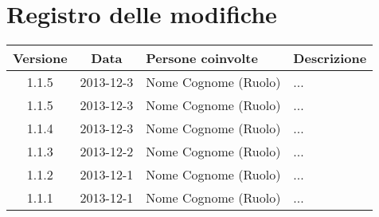 \section*{Registro delle modifiche}

\small{
\begin{tabularx}{\textwidth}{|c|c|l|X|}
 \hline \textbf{Versione} & \textbf{Data} & \textbf{Persone coinvolte} & \textbf{Descrizione} \\

 
 \hline 1.1.5 & 2013-12-3 & Nome Cognome (Ruolo) &
 ...\\

 \hline 1.1.5 & 2013-12-3 & Nome Cognome (Ruolo) &
 ...\\

 \hline 1.1.4 & 2013-12-3 & Nome Cognome (Ruolo) &
 ...\\

 \hline 1.1.3 & 2013-12-2 & Nome Cognome (Ruolo) &
 ...\\

 \hline 1.1.2 & 2013-12-1 & Nome Cognome (Ruolo) &
 ...\\

 \hline 1.1.1 & 2013-12-1 & Nome Cognome (Ruolo) &
 ...\\

 \hline
\end{tabularx}
}
